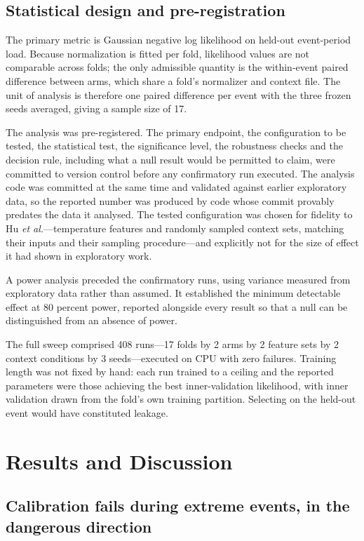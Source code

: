 \documentclass[12pt]{article} %
\begin{document}
\subsection{Statistical design and pre-registration}

The primary metric is Gaussian negative log likelihood on held-out event-period
load. Because normalization is fitted per fold, likelihood values are not
comparable across folds; the only admissible quantity is the within-event paired
difference between arms, which share a fold's normalizer and context file. The
unit of analysis is therefore one paired difference per event with the three
frozen seeds averaged, giving a sample size of 17.

The analysis was pre-registered. The primary endpoint, the configuration to be
tested, the statistical test, the significance level, the robustness checks and
the decision rule, including what a null result would be permitted to claim, were
committed to version control before any confirmatory run executed. The analysis
code was committed at the same time and validated against earlier exploratory
data, so the reported number was produced by code whose commit provably predates
the data it analysed. The tested configuration was chosen for fidelity to Hu
\emph{et al.}---temperature features and randomly sampled context sets, matching
their inputs and their sampling procedure---and explicitly not for the size of
effect it had shown in exploratory work.

A power analysis preceded the confirmatory runs, using variance measured from
exploratory data rather than assumed. It established the minimum detectable
effect at 80 percent power, reported alongside every result so that a null can be
distinguished from an absence of power.

The full sweep comprised 408 runs---17 folds by 2 arms by 2 feature sets by 2
context conditions by 3 seeds---executed on CPU with zero failures. Training
length was not fixed by hand: each run trained to a ceiling and the reported
parameters were those achieving the best inner-validation likelihood, with inner
validation drawn from the fold's own training partition. Selecting on the
held-out event would have constituted leakage.

\section{Results and Discussion}

\subsection{Calibration fails during extreme events, in the dangerous direction}
\end{document}
